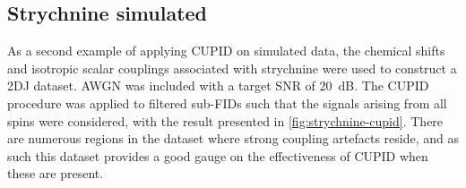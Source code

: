 
\subsection{Strychnine simulated}
\label{subsec:strychnine-cupid}
As a second example of applying \ac{CUPID} on simulated data, the chemical
shifts and isotropic scalar couplings associated with strychnine
were used to construct a 2DJ dataset. \ac{AWGN} was included with a target
\ac{SNR} of \qty{20}{\deci\bel}. The CUPID procedure was applied to filtered
sub-FIDs such that the signals arising from all spins were considered, with the
result presented in \cref{fig:strychnine-cupid}. There are numerous
regions in the dataset where strong coupling artefacts reside, and as such this
dataset provides a good gauge on the effectiveness of \ac{CUPID} when these are
present.

